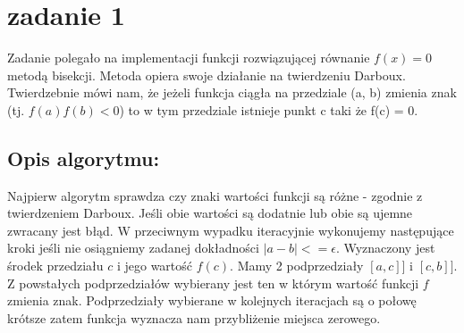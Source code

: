 \section{zadanie 1}
Zadanie polegało na implementacji funkcji rozwiązującej równanie \(f(x) = 0\) metodą bisekcji. Metoda opiera swoje działanie na twierdzeniu Darboux. Twierdzebnie mówi nam, że jeżeli funkcja ciągła na przedziale (a, b) zmienia znak (tj. \(f(a)f(b) < 0\)) to w tym przedziale istnieje punkt c taki że f(c) = 0.

\subsection{Opis algorytmu: }
Najpierw algorytm sprawdza czy znaki wartości funkcji są różne - zgodnie z twierdzeniem Darboux. Jeśli obie wartości są dodatnie lub obie są ujemne zwracany jest błąd. W przeciwnym wypadku iteracyjnie wykonujemy następujące kroki jeśli nie osiągniemy zadanej dokładności \(|a - b| <= \epsilon\).
Wyznaczony jest środek przedziału \(c\) i jego wartość \(f(c)\). Mamy 2 podprzedziały \([a, c]]\) i \([c, b]]\). Z powstałych podprzedziałów wybierany jest ten w którym wartość funkcji \(f\) zmienia znak. Podprzedziały wybierane w kolejnych iteracjach są o połowę krótsze zatem funkcja wyznacza nam przybliżenie miejsca zerowego.